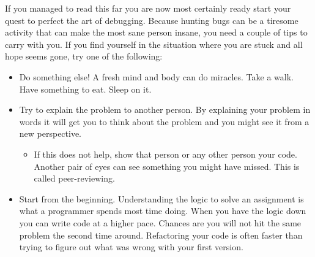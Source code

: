 \documentclass[11pt,a4paper,twoside]{article}
\begin{document}
If you managed to read this far you are now most certainly ready start your
quest to perfect the art of debugging. Because hunting bugs can be a tiresome
activity that can make the most sane person insane, you need a couple of tips
to carry with you. If you find yourself in the situation where you are stuck
and all hope seems gone, try one of the following: 

\begin{itemize} 
    \item Do something else! A fresh mind and body can do miracles. Take a walk.
          Have something to eat. Sleep on it. 
    \item Try to explain the problem to another person. By explaining your 
          problem in words it will get you to think about the problem and you 
          might see it from a new perspective.  
    \begin{itemize}
        \item If this does not help, show that person or any other person
              your code. Another pair of eyes can see something you might have 
              missed. This is called peer-reviewing.
    \end{itemize}
    
    \item Start from the beginning. Understanding the logic to solve an 
          assignment is what a programmer spends most time doing. When you have
          the logic down you can write code at a higher pace. Chances are you
          will not hit the same problem the second time around. Refactoring your
          code is often faster than trying to figure out what was wrong with 
          your first version.
\end{itemize}
\end{document}
